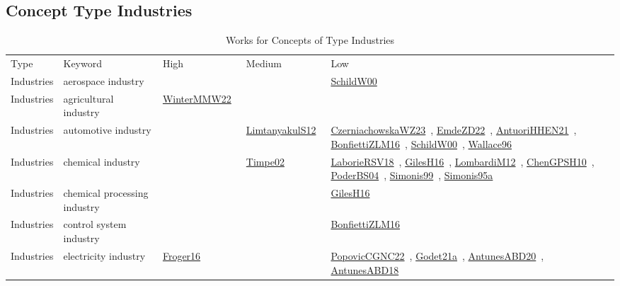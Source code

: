 \clearpage
\subsection{Concept Type Industries}
\label{sec:Industries}
{\scriptsize
\begin{longtable}{lp{3cm}>{\raggedright\arraybackslash}p{6cm}>{\raggedright\arraybackslash}p{6cm}>{\raggedright\arraybackslash}p{8cm}}
\rowcolor{white}\caption{Works for Concepts of Type Industries}\\ \toprule
\rowcolor{white}Type & Keyword & High & Medium & Low\\ \midrule\endhead
\bottomrule
\endfoot
Industries & aerospace industry &  &  & \href{works/SchildW00.pdf}{SchildW00}~\cite{SchildW00}\\
Industries & agricultural industry & \href{works/WinterMMW22.pdf}{WinterMMW22}~\cite{WinterMMW22} &  & \\
Industries & automotive industry &  & \href{works/LimtanyakulS12.pdf}{LimtanyakulS12}~\cite{LimtanyakulS12} & \href{works/CzerniachowskaWZ23.pdf}{CzerniachowskaWZ23}~\cite{CzerniachowskaWZ23}, \href{works/EmdeZD22.pdf}{EmdeZD22}~\cite{EmdeZD22}, \href{works/AntuoriHHEN21.pdf}{AntuoriHHEN21}~\cite{AntuoriHHEN21}, \href{works/BonfiettiZLM16.pdf}{BonfiettiZLM16}~\cite{BonfiettiZLM16}, \href{works/SchildW00.pdf}{SchildW00}~\cite{SchildW00}, \href{works/Wallace96.pdf}{Wallace96}~\cite{Wallace96}\\
Industries & chemical industry &  & \href{works/Timpe02.pdf}{Timpe02}~\cite{Timpe02} & \href{works/LaborieRSV18.pdf}{LaborieRSV18}~\cite{LaborieRSV18}, \href{works/GilesH16.pdf}{GilesH16}~\cite{GilesH16}, \href{works/LombardiM12.pdf}{LombardiM12}~\cite{LombardiM12}, \href{works/ChenGPSH10.pdf}{ChenGPSH10}~\cite{ChenGPSH10}, \href{works/PoderBS04.pdf}{PoderBS04}~\cite{PoderBS04}, \href{works/Simonis99.pdf}{Simonis99}~\cite{Simonis99}, \href{works/Simonis95a.pdf}{Simonis95a}~\cite{Simonis95a}\\
Industries & chemical processing industry &  &  & \href{works/GilesH16.pdf}{GilesH16}~\cite{GilesH16}\\
Industries & control system industry &  &  & \href{works/BonfiettiZLM16.pdf}{BonfiettiZLM16}~\cite{BonfiettiZLM16}\\
Industries & electricity industry & \href{works/Froger16.pdf}{Froger16}~\cite{Froger16} &  & \href{works/PopovicCGNC22.pdf}{PopovicCGNC22}~\cite{PopovicCGNC22}, \href{works/Godet21a.pdf}{Godet21a}~\cite{Godet21a}, \href{works/AntunesABD20.pdf}{AntunesABD20}~\cite{AntunesABD20}, \href{works/AntunesABD18.pdf}{AntunesABD18}~\cite{AntunesABD18}\\

\end{longtable}}
